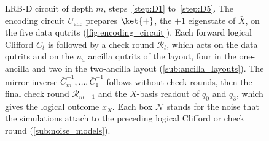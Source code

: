 \begin{figure}[tp]
    \centering
    \caption{LRB-D circuit of depth $m$, steps~\ref{step:D1} to~\ref{step:D5}. The encoding circuit $U_{\mathrm{enc}}$ prepares $\ket{\bar +}$, the $+1$ eigenstate of $\bar X$, on the five data qutrits (\autoref{fig:encoding_circuit}). Each forward logical Clifford $\bar C_t$ is followed by a check round $\mathcal{R}_t$, which acts on the data qutrits and on the $n_a$ ancilla qutrits of the layout, four in the one-ancilla and two in the two-ancilla layout (\autoref{sub:ancilla_layouts}). The mirror inverse $\bar C_m^{-1}, \dots, \bar C_1^{-1}$ follows without check rounds, then the final check round $\mathcal{R}_{m+1}$ and the $X$-basis readout of $q_0$ and $q_3$, which gives the logical outcome $x_{\bar X}$. Each box $\mathcal{N}$ stands for the noise that the simulations attach to the preceding logical Clifford or check round (\autoref{sub:noise_models}).}
    \label{fig:lrb_d_full}\label{fig:lrb_a}\label{fig:lrb_overview}
\end{figure}

